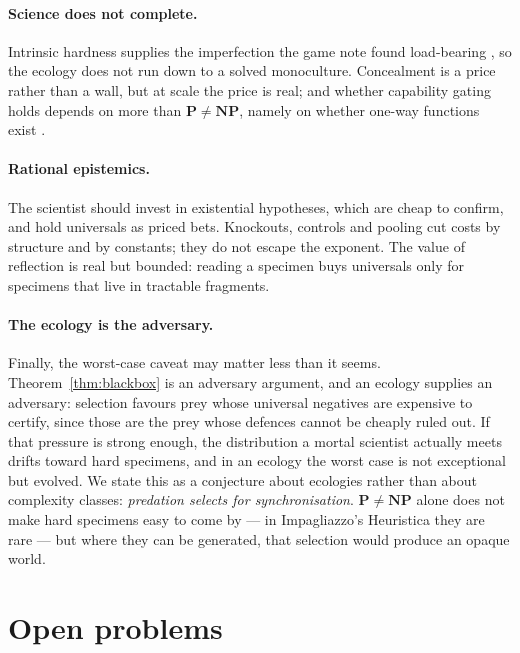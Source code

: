 \documentclass[11pt]{article}
\theoremstyle{definition}
\theoremstyle{plain}
\theoremstyle{remark}
\newcommand{\Pclass}{\mathbf{P}}
\newcommand{\NPclass}{\mathbf{NP}}
\begin{document}
\paragraph{Science does not complete.} Intrinsic hardness supplies the
imperfection the game note found load-bearing \cite{GameNote}, so the
ecology does not run down to a solved monoculture. Concealment is a price
rather than a wall, but at scale the price is real; and whether
capability gating holds depends on more than $\Pclass \neq \NPclass$,
namely on whether one-way functions exist \cite{Impagliazzo95}.

\paragraph{Rational epistemics.} The scientist should invest in
existential hypotheses, which are cheap to confirm, and hold universals as
priced bets. Knockouts, controls and pooling cut costs by structure and by
constants; they do not escape the exponent. The value of reflection is
real but bounded: reading a specimen buys universals only for specimens
that live in tractable fragments.

\paragraph{The ecology is the adversary.} Finally, the worst-case
caveat may matter less than it seems. Theorem~\ref{thm:blackbox} is an
adversary argument, and an ecology supplies an adversary: selection favours
prey whose universal negatives are expensive to certify, since those are
the prey whose defences cannot be cheaply ruled out. If that pressure is
strong enough, the distribution a mortal scientist actually meets drifts
toward hard specimens, and in an ecology the worst case is not exceptional
but evolved. We state this as a conjecture about ecologies rather than
about complexity classes: \emph{predation selects for synchronisation}.
$\Pclass \neq \NPclass$ alone does not make hard specimens easy to come
by --- in Impagliazzo's Heuristica they are rare --- but where they can
be generated, that selection would produce an opaque world.

\section{Open problems}\label{sec:open}
\end{document}
